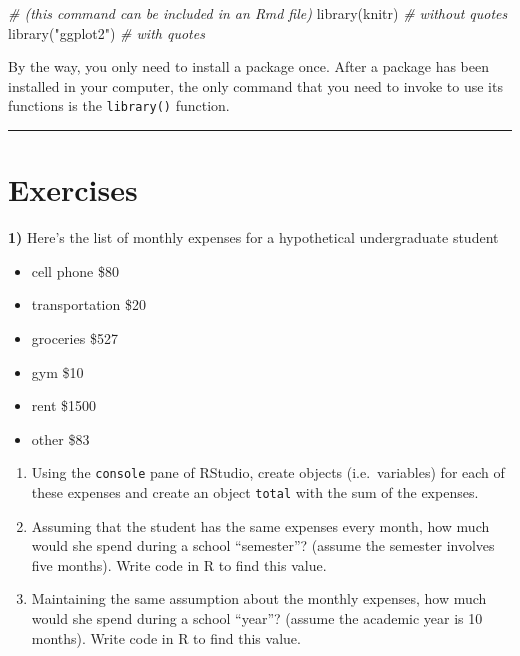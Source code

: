 \documentclass[
]{book}
\newenvironment{Shaded}{\begin{snugshade}}{\end{snugshade}}
\newcommand{\CommentTok}[1]{\textcolor[rgb]{0.56,0.35,0.01}{\textit{#1}}}
\newcommand{\FunctionTok}[1]{\textcolor[rgb]{0.00,0.00,0.00}{#1}}
\newcommand{\NormalTok}[1]{#1}
\newcommand{\StringTok}[1]{\textcolor[rgb]{0.31,0.60,0.02}{#1}}
\providecommand{\tightlist}{%
  \setlength{\itemsep}{0pt}\setlength{\parskip}{0pt}}
\begin{document}
\begin{Shaded}
\begin{Highlighting}[]
\CommentTok{\# (this command can be included in an Rmd file)}
\FunctionTok{library}\NormalTok{(knitr)      }\CommentTok{\# without quotes}
\FunctionTok{library}\NormalTok{(}\StringTok{"ggplot2"}\NormalTok{)  }\CommentTok{\# with quotes}
\end{Highlighting}
\end{Shaded}

By the way, you only need to install a package once. After a package has been
installed in your computer, the only command that you need to invoke to use
its functions is the \texttt{library()} function.

\begin{center}\rule{0.5\linewidth}{0.5pt}\end{center}

\hypertarget{exercises}{%
\section{Exercises}\label{exercises}}

\textbf{1)} Here's the list of monthly expenses for a hypothetical undergraduate
student

\begin{itemize}
\tightlist
\item
  cell phone \$80
\item
  transportation \$20
\item
  groceries \$527
\item
  gym \$10
\item
  rent \$1500
\item
  other \$83
\end{itemize}

\begin{enumerate}
\def\labelenumi{\alph{enumi})}
\item
  Using the \texttt{console} pane of RStudio, create objects (i.e.~variables) for each
  of these expenses and create an object \texttt{total} with the sum of the expenses.
\item
  Assuming that the student has the same expenses every month, how much would
  she spend during a school ``semester''? (assume the semester involves five months).
  Write code in R to find this value.
\item
  Maintaining the same assumption about the monthly expenses, how much would she
  spend during a school ``year''? (assume the academic year is 10 months).
  Write code in R to find this value.
\end{enumerate}
\end{document}
